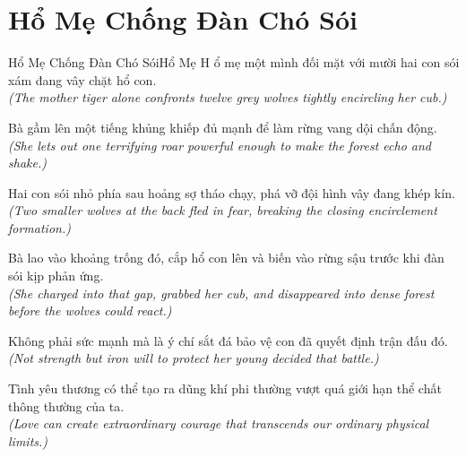 \section{Hổ Mẹ Chống Đàn Chó Sói}
\begin{truyen}{Hổ Mẹ Chống Đàn Chó Sói}{Hổ Mẹ}
H ổ mẹ một mình đối mặt với mười hai con sói xám đang vây chặt hổ con.\\
\textit{(The mother tiger alone confronts twelve grey wolves tightly encircling her cub.)}

Bà gầm lên một tiếng khủng khiếp đủ mạnh để làm rừng vang dội chấn động.\\
\textit{(She lets out one terrifying roar powerful enough to make the forest echo and shake.)}

Hai con sói nhỏ phía sau hoảng sợ tháo chạy, phá vỡ đội hình vây đang khép kín.\\
\textit{(Two smaller wolves at the back fled in fear, breaking the closing encirclement formation.)}

Bà lao vào khoảng trống đó, cắp hổ con lên và biến vào rừng sậu trước khi đàn sói kịp phản ứng.\\
\textit{(She charged into that gap, grabbed her cub, and disappeared into dense forest before the wolves could react.)}

Không phải sức mạnh mà là ý chí sắt đá bảo vệ con đã quyết định trận đấu đó.\\
\textit{(Not strength but iron will to protect her young decided that battle.)}

\end{truyen}
\begin{baihoc}
  Tình yêu thương có thể tạo ra dũng khí phi thường vượt quá giới hạn thể chất thông thường của ta.\\
  \textit{(Love can create extraordinary courage that transcends our ordinary physical limits.)}
\end{baihoc}

